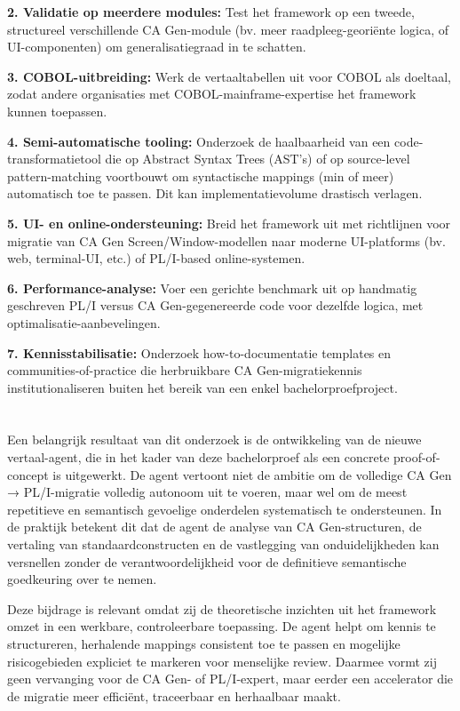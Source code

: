 \textbf{2. Validatie op meerdere modules:} Test het framework op een tweede, structureel verschillende CA Gen-module 
(bv. meer raadpleeg-georiënte logica, of UI-componenten) om generalisatiegraad in te schatten.

\textbf{3. COBOL-uitbreiding:} Werk de vertaaltabellen uit voor COBOL als doeltaal, zodat andere organisaties met 
COBOL-mainframe-expertise het framework kunnen toepassen.

\textbf{4. Semi-automatische tooling:} Onderzoek de haalbaarheid van een code-transformatietool die op Abstract 
Syntax Trees (AST's) of op source-level pattern-matching voortbouwt om syntactische mappings (min of meer) 
automatisch toe te passen. Dit kan implementatievolume drastisch verlagen.

\textbf{5. UI- en online-ondersteuning:} Breid het framework uit met richtlijnen voor migratie van CA Gen 
Screen/Window-modellen naar moderne UI-platforms (bv. web, terminal-UI, etc.) of PL/I-based online-systemen.

\textbf{6. Performance-analyse:} Voer een gerichte benchmark uit op handmatig geschreven PL/I versus CA 
Gen-gegenereerde code voor dezelfde logica, met optimalisatie-aanbevelingen.

\textbf{7. Kennisstabilisatie:} Onderzoek how-to-documentatie templates en communities-of-practice die herbruikbare 
CA Gen-migratiekennis institutionaliseren buiten het bereik van een enkel bachelorproefproject.

\section{}%
\label{sec:nieuwe-vertaal-agent-conclusie}

Een belangrijk resultaat van dit onderzoek is de ontwikkeling van de nieuwe vertaal-agent, die in het kader van deze bachelorproef 
als een concrete proof-of-concept is uitgewerkt. De agent vertoont niet de ambitie om de volledige CA Gen → PL/I-migratie volledig 
autonoom uit te voeren, maar wel om de meest repetitieve en semantisch gevoelige onderdelen systematisch te ondersteunen. 
In de praktijk betekent dit dat de agent de analyse van CA Gen-structuren, de vertaling van standaardconstructen en de vastlegging 
van onduidelijkheden kan versnellen zonder de verantwoordelijkheid voor de definitieve semantische goedkeuring over te nemen.

Deze bijdrage is relevant omdat zij de theoretische inzichten uit het framework omzet in een werkbare, controleerbare toepassing. 
De agent helpt om kennis te structureren, herhalende mappings consistent toe te passen en mogelijke risicogebieden expliciet te markeren 
voor menselijke review. Daarmee vormt zij geen vervanging voor de CA Gen- of PL/I-expert, maar eerder een accelerator die de migratie 
meer efficiënt, traceerbaar en herhaalbaar maakt.


